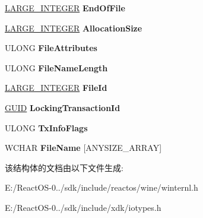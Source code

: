 \begin{DoxyCompactItemize}
\hyperlink{union___l_a_r_g_e___i_n_t_e_g_e_r}{L\+A\+R\+G\+E\+\_\+\+I\+N\+T\+E\+G\+ER} {\bfseries End\+Of\+File}
\item 
\mbox{\label{struct___f_i_l_e___i_d___g_l_o_b_a_l___t_x___d_i_r___i_n_f_o_r_m_a_t_i_o_n_aedd94eb091e7d79152547fba1a25261a}} 
\hyperlink{union___l_a_r_g_e___i_n_t_e_g_e_r}{L\+A\+R\+G\+E\+\_\+\+I\+N\+T\+E\+G\+ER} {\bfseries Allocation\+Size}
\item 
\mbox{\label{struct___f_i_l_e___i_d___g_l_o_b_a_l___t_x___d_i_r___i_n_f_o_r_m_a_t_i_o_n_a32e65458ece3b6268029c14e17e6921e}} 
U\+L\+O\+NG {\bfseries File\+Attributes}
\item 
\mbox{\label{struct___f_i_l_e___i_d___g_l_o_b_a_l___t_x___d_i_r___i_n_f_o_r_m_a_t_i_o_n_a7784325dca15e1d7b0ca9add06cd36ac}} 
U\+L\+O\+NG {\bfseries File\+Name\+Length}
\item 
\mbox{\label{struct___f_i_l_e___i_d___g_l_o_b_a_l___t_x___d_i_r___i_n_f_o_r_m_a_t_i_o_n_a3b3468d217ab33c595501809c5d05846}} 
\hyperlink{union___l_a_r_g_e___i_n_t_e_g_e_r}{L\+A\+R\+G\+E\+\_\+\+I\+N\+T\+E\+G\+ER} {\bfseries File\+Id}
\item 
\mbox{\label{struct___f_i_l_e___i_d___g_l_o_b_a_l___t_x___d_i_r___i_n_f_o_r_m_a_t_i_o_n_a0572fdda9e2b6740b4f0b3b2f778c5f0}} 
\hyperlink{interface_g_u_i_d}{G\+U\+ID} {\bfseries Locking\+Transaction\+Id}
\item 
\mbox{\label{struct___f_i_l_e___i_d___g_l_o_b_a_l___t_x___d_i_r___i_n_f_o_r_m_a_t_i_o_n_ad393e2973dd48cd0da60503b73d1bb47}} 
U\+L\+O\+NG {\bfseries Tx\+Info\+Flags}
\item 
\mbox{\label{struct___f_i_l_e___i_d___g_l_o_b_a_l___t_x___d_i_r___i_n_f_o_r_m_a_t_i_o_n_ae38bf8c9913471c2843949b7ed72c684}} 
W\+C\+H\+AR {\bfseries File\+Name} \mbox{[}A\+N\+Y\+S\+I\+Z\+E\+\_\+\+A\+R\+R\+AY\mbox{]}
\end{DoxyCompactItemize}


该结构体的文档由以下文件生成\+:\begin{DoxyCompactItemize}
\item 
E\+:/\+React\+O\+S-\/0../sdk/include/reactos/wine/winternl.\+h\item 
E\+:/\+React\+O\+S-\/0../sdk/include/xdk/iotypes.\+h\end{DoxyCompactItemize}
